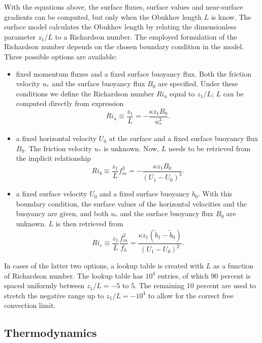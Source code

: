 \documentclass[gmd]{copernicus}
\begin{document}
With the equations above, the surface fluxes, surface values and near-surface gradients can be computed, but only when the Obukhov length $L$ is know. The surface model calculates the Obukhov length by relating the dimensionless parameter $z_1/ L$ to a Richardson number. The employed formulation of the Richardson number depends on the chosen boundary condition in the model. Three possible options are available:
\begin{itemize}
	\item fixed momentum fluxes and a fixed surface buoyancy flux. Both the friction velocity $u_*$ and the surface buoyancy flux $B_0$ are specified. Under these conditions we define the Richardson number $Ri_a$ equal to $z_1/L$; $L$ can be computed directly from expression
	\begin{equation}
	Ri_a \equiv \dfrac{z_1}{L} = - \dfrac{\kappa z_1 B_0}{u_*^3}.
	\end{equation}
	\item a fixed horizontal velocity $U_0$ at the surface and a fixed surface buoyancy flux $B_0$. The friction velocity $u_*$ is unknown. Now,  $L$ needs to be retrieved from the implicit relationship 
	\begin{equation}
	Ri_b \equiv \dfrac{z_1}{L} f_m^3 = - \dfrac{\kappa z_1 B_0}{ \left(U_1 - U_0 \right)^3}.
	\end{equation}
	\item a fixed surface velocity $U_0$ and a fixed surface buoyancy $b_0$. With this boundary condition, the surface values of the horizontal velocities and the buoyancy are given, and both $u_*$ and the surface buoyancy flux $B_0$ are unknown. $L$ is then retrieved from
	\begin{equation}
	Ri_c \equiv \dfrac{z_1}{L} \dfrac{f_m^2}{f_h} = \dfrac{\kappa z_1 \left(\widetilde{b}_1 - \widetilde{b}_0 \right)}{ \left(U_1 - U_0 \right)^2}.
	\end{equation}
\end{itemize}
In cases of the latter two options, a lookup table is created  with $L$ as a function of Richardson number. The lookup table has $10^4$ entries, of which 90 percent is spaced uniformly between $z_1/L = -5$ to $5$. The remaining 10 percent are used to stretch the negative range up to $z_1/L = -10^4$ to allow for the correct free convection limit.

\subsection{Thermodynamics}\label{sec:thermo}
\end{document}

